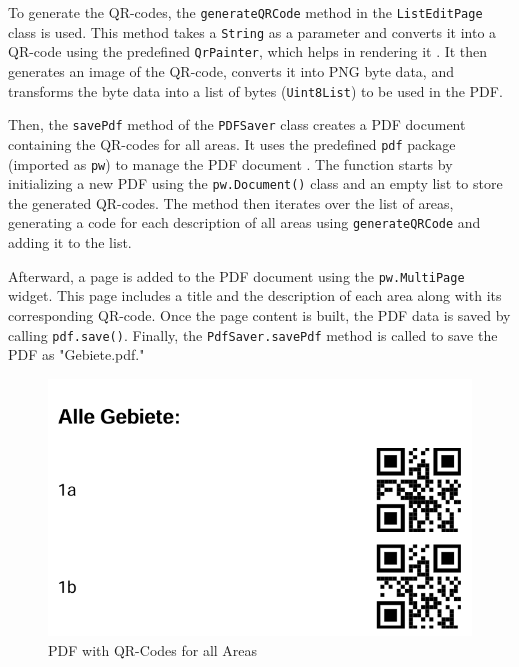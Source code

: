 To generate the QR-codes, the \texttt{generateQRCode} method in the \texttt{ListEditPage} class is used. This method takes a \texttt{String} as a parameter and converts it into a QR-code using the predefined \texttt{QrPainter}, which helps in rendering it \autocite{pub.dev/QrPainter-class}. It then generates an image of the QR-code, converts it into PNG byte data, and transforms the byte data into a list of bytes (\texttt{Uint8List}) to be used in the PDF. \blankLine

Then, the \texttt{savePdf} method of the \texttt{PDFSaver} class creates a PDF document containing the QR-codes for all areas. It uses the predefined \texttt{pdf} package (imported as \texttt{pw}) to manage the PDF document \autocite{pub.dev/pdf}. The function starts by initializing a new PDF using the \texttt{pw.Document()} class and an empty list to store the generated QR-codes. The method then iterates over the list of areas, generating a code for each description of all areas using \texttt{generateQRCode} and adding it to the list.\blankLine

Afterward, a page is added to the PDF document using the \texttt{pw.MultiPage} widget. This page includes a title and the description of each area along with its corresponding QR-code. Once the page content is built, the PDF data is saved by calling \texttt{pdf.save()}. Finally, the \texttt{PdfSaver.savePdf} method is called to save the PDF as "Gebiete.pdf."

\begin{figure}[H]
    \centering
    \includegraphics[width=0.5\linewidth]{images/AdminPanel/GebietePDF.png}
    \caption{PDF with QR-Codes for all Areas}
\end{figure}


